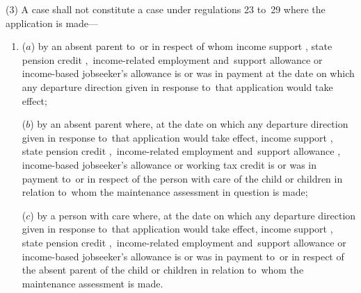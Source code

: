 \documentclass[12pt,a4paper]{article}
\begin{document}
(3) A case shall not constitute a case under regulations 23 to~29 where the application is made—
\begin{enumerate}\item[]
($a$) by an absent parent to~or in respect of whom income support%
, state pension credit%
,~income-related employment and~support allowance  %
or income-based jobseeker’s allowance is or was in payment at the date on which any departure direction given in response to~that application would take effect;

($b$) by an absent parent where, at the date on which any departure direction given in response to~that application would take effect, income support%
, state pension credit%
,~income-related employment and~support allowance%
, income-based jobseeker’s allowance
or working tax credit  %
is or was in payment to~or in respect of the person with care of the child or children in relation to~whom the maintenance assessment in question is made;

($c$) by a person with care where, at the date on which any departure direction given in response to~that application would take effect, income support%
, state pension credit%
,~income-related employment and~support allowance  %
or income-based jobseeker’s allowance is or was in payment to~or in respect of the absent parent of the child or children in relation to~whom the maintenance assessment is made.
\end{enumerate}


\end{document}
